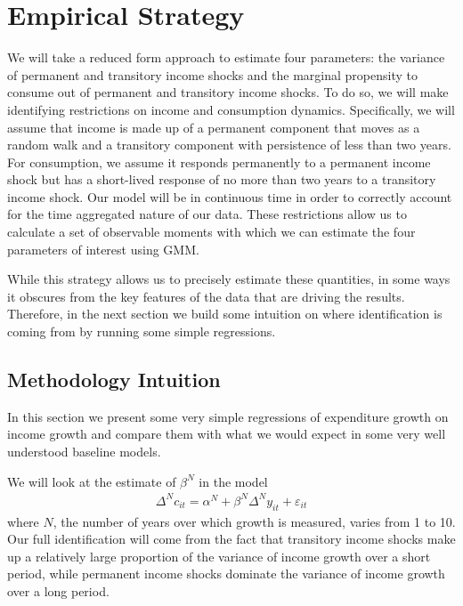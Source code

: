\documentclass[titlepage]{\econtex}\newcommand{\texname}{ConsumptionHeterogeneity}
\begin{document}
\section{Empirical Strategy} \label{empirical_strategy} 
We will take a reduced form approach to estimate four parameters: the variance of permanent and transitory income shocks and the marginal propensity to consume out of permanent and transitory income shocks. To do so, we will make identifying restrictions on income and consumption dynamics. Specifically, we will assume that income is made up of a permanent component that moves as a random walk and a transitory component with persistence of less than two years. For consumption, we assume it responds permanently to a permanent income shock but has a short-lived response of no more than two years to a transitory income shock. Our model will be in continuous time in order to correctly account for the time aggregated nature of our data. These restrictions allow us to calculate a set of observable moments with which we can estimate the four parameters of interest using GMM.

 While this strategy allows us to precisely estimate these quantities, in some ways it obscures from the key features of the data that are driving the results. Therefore, in the next section we build some intuition on where identification is coming from by running some simple regressions.

\subsection{Methodology Intuition}
In this section we present some very simple regressions of expenditure growth on income growth and compare them with what we would expect in some very well understood baseline models.

We will look at the estimate of $\beta^N$ in the model
\begin{align*}
    \Delta^N c_{it} = \alpha^N + \beta^N \Delta^N y_{it} + \varepsilon_{it}
\end{align*}
where $N$, the number of years over which growth is measured, varies from 1 to 10. Our full identification will come from the fact that transitory income shocks make up a relatively large proportion of the variance of income growth over a short period, while permanent income shocks dominate the variance of income growth over a long period.
\end{document}
